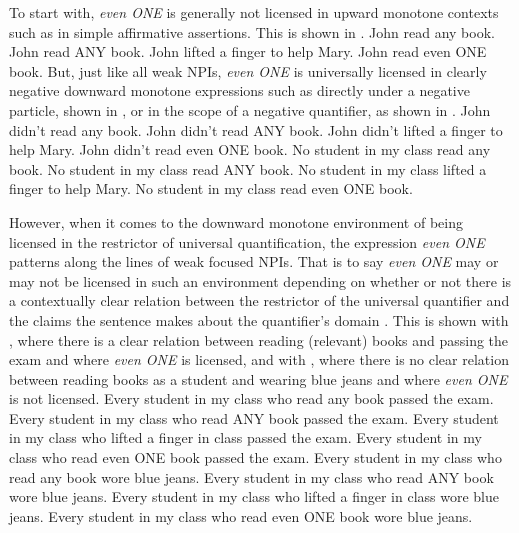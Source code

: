 To start with, \textit{even \MakeUppercase{one}} is generally not licensed in upward monotone contexts such as in simple affirmative assertions. This is shown in .
\pex\label{ex:even-um}
\a\ljudge{\#} John read any book.
\a\ljudge{\#} John read \MakeUppercase{any} book.
\a\ljudge{\#} John lifted a finger to help Mary.
\a\ljudge{\#} John read even \MakeUppercase{one} book.
\xe
But, just like all weak NPIs, \textit{even ONE} is universally licensed in clearly negative downward monotone expressions such as directly under a negative particle, shown in , or in the scope of a negative quantifier, as shown in .
\pex\label{ex:even-negation}
\a John didn't read any book.
\a John didn't read \MakeUppercase{any} book.
\a John didn't lifted a finger to help Mary.
\a John didn't read even \MakeUppercase{one} book.
\xe
\pex\label{ex:even-dm}
\a No student in my class read any book.
\a No student in my class read \MakeUppercase{any} book.
\a No student in my class lifted a finger to help Mary.
\a No student in my class read even \MakeUppercase{one} book.
\xe

However, when it comes to the downward monotone environment of being licensed in the restrictor of universal quantification, the expression \textit{even \MakeUppercase{one}} patterns along the lines of weak focused NPIs. That is to say \textit{even \MakeUppercase{one}} may or may not be licensed in such an environment depending on whether or not there is a contextually clear relation between the restrictor of the universal quantifier and the claims the sentence makes about the quantifier's domain \parencite{Crnic2014-dogma}. This is shown with , where there is a clear relation between reading (relevant) books and passing the exam and where \textit{even \MakeUppercase{one}} is licensed, and with , where there is no clear relation between reading books as a student and wearing blue jeans and where \textit{even \MakeUppercase{one}} is not licensed.
\pex\label{ex:even-every-okay}
\a Every student in my class who read any book passed the exam.
\a Every student in my class who read \MakeUppercase{any} book passed the exam.
\a Every student in my class who lifted a finger in class passed the exam.
\a Every student in my class who read even \MakeUppercase{one} book passed the exam.
\xe
\pex\label{ex:even-every-bad}
\a Every student in my class who read any book wore blue jeans.
\a\ljudge{\#} Every student in my class who read \MakeUppercase{any} book wore blue jeans.
\a\ljudge{\#} Every student in my class who lifted a finger in class wore blue jeans.
\a\ljudge{\#} Every student in my class who read even \MakeUppercase{one} book wore blue jeans.
\xe

